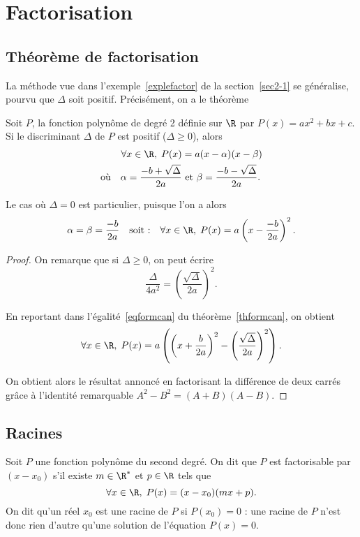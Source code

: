 \section{Factorisation}
\subsection{Théorème de factorisation}
La méthode vue dans l'exemple \ref{explefactor} de la section \ref{sec2-1} se généralise, pourvu que $\Delta$ soit positif. Précisément, on a le théorème 
\begin{thm}\label{thfactor}%
Soit $P$, la fonction polynôme de degré 2 définie sur $\R$ par $P(x)=ax^2+bx+c$.  Si le discriminant $\Delta$ de $P$ est positif ($\Delta≥0$), alors
\begin{align*}
\forall x \in\R,\;P(x)&=a(x-\alpha)(x-\beta)\\
\text{où}\quad\alpha=\frac{-b+\sqrt{\Delta}}{2a}&\text{ et }\beta=\frac{-b-\sqrt{\Delta}}{2a}.
\end{align*}
\end{thm} 
\begin{remark}
Le cas où $\Delta=0$ est particulier, puisque l'on a alors 
\[
\alpha=\beta=\frac{-b}{2a}\quad\text{soit :}\quad\forall x\in\R,\;P(x)=a\left(x-\frac{-b}{2a}\right)^2.
\]
\end{remark}

\begin{proof}
On remarque que si $\Delta≥0$, on peut écrire
\[
\frac{\Delta}{4a^2}=\left(\frac{\sqrt{\Delta}}{2a}\right)^2.
\] 

En reportant dans l'égalité \eqref{eqformcan} du théorème \ref{thformcan}, on obtient
\[
\forall x\in\R,\;P(x)=a\left(\left(x+\frac{b}{2a}\right)^2-\left(\frac{\sqrt{\Delta}}{2a}\right)^2\right).
\]

On obtient alors le résultat annoncé en factorisant la différence de deux carrés grâce à l'identité remarquable $A^2-B^2=(A+B)(A-B)$.
\end{proof}

\subsection{Racines}
Soit $P$ une fonction polynôme du second degré. 
On dit que $P$ est factorisable par $(x-x_0)$ s'il existe $m\in\R^*$ et $p\in\R$ tels que
\begin{equation}\forall x\in\R,\;P(x)=(x-x_0)(mx+p).\label{eqfactorx0}\end{equation}
On dit qu'un réel $x_0$ est une racine de $P$ si $P(x_0)=0$ : une racine de $P$ n'est donc rien d'autre qu'une solution de l'équation $P(x)=0$.

